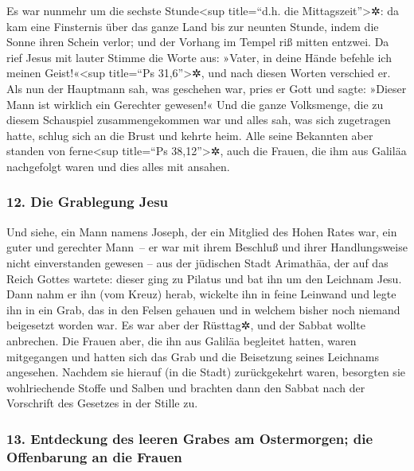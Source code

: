  Es war nunmehr um die sechste Stunde\textless sup
title=``d.h. die Mittagszeit''\textgreater✲: da kam eine Finsternis über
das ganze Land bis zur neunten Stunde,  indem die Sonne
ihren Schein verlor; und der Vorhang im Tempel riß mitten entzwei.
 Da rief Jesus mit lauter Stimme die Worte aus: »Vater,
in deine Hände befehle ich meinen Geist!«\textless sup title=``Ps
31,6''\textgreater✲, und nach diesen Worten verschied er.
 Als nun der Hauptmann sah, was geschehen war, pries er
Gott und sagte: »Dieser Mann ist wirklich ein Gerechter gewesen!«
 Und die ganze Volksmenge, die zu diesem Schauspiel
zusammengekommen war und alles sah, was sich zugetragen hatte, schlug
sich an die Brust und kehrte heim.  Alle seine Bekannten
aber standen von ferne\textless sup title=``Ps 38,12''\textgreater✲,
auch die Frauen, die ihm aus Galiläa nachgefolgt waren und dies alles
mit ansahen.

\hypertarget{die-grablegung-jesu}{%
\subsubsection{12. Die Grablegung Jesu}\label{die-grablegung-jesu}}

 Und siehe, ein Mann namens Joseph, der ein Mitglied des
Hohen Rates war, ein guter und gerechter Mann~--  er war
mit ihrem Beschluß und ihrer Handlungsweise nicht einverstanden gewesen
-- aus der jüdischen Stadt Arimathäa, der auf das Reich Gottes wartete:
 dieser ging zu Pilatus und bat ihn um den Leichnam Jesu.
 Dann nahm er ihn (vom Kreuz) herab, wickelte ihn in
feine Leinwand und legte ihn in ein Grab, das in den Felsen gehauen und
in welchem bisher noch niemand beigesetzt worden war.  Es
war aber der Rüsttag✲, und der Sabbat wollte anbrechen. 
Die Frauen aber, die ihn aus Galiläa begleitet hatten, waren mitgegangen
und hatten sich das Grab und die Beisetzung seines Leichnams angesehen.
 Nachdem sie hierauf (in die Stadt) zurückgekehrt waren,
besorgten sie wohlriechende Stoffe und Salben und brachten dann den
Sabbat nach der Vorschrift des Gesetzes in der Stille zu.

\hypertarget{entdeckung-des-leeren-grabes-am-ostermorgen-die-offenbarung-an-die-frauen}{%
\subsubsection{13. Entdeckung des leeren Grabes am Ostermorgen; die
Offenbarung an die
Frauen}\label{entdeckung-des-leeren-grabes-am-ostermorgen-die-offenbarung-an-die-frauen}}

